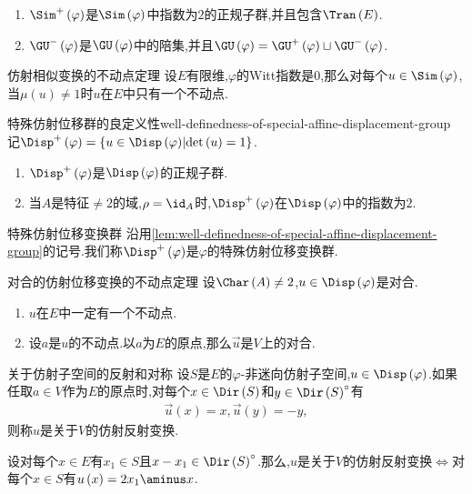 \begin{remark}{}{}
	\begin{enumerate}
		\item $\Sim^{+}\left(\varphi\right)$是$\Sim\left(\varphi\right)$中指数为$2$的正规子群,并且包含$\Tran\left(E\right)$.
		\item $\GU^{-}\left(\varphi\right)$是$\GU\left(\varphi\right)$中的陪集,并且$\GU\left(\varphi\right)=\GU^{+}\left(\varphi\right)\sqcup\GU^{-}\left(\varphi\right)$.
	\end{enumerate}
\end{remark}

\begin{proposition}{仿射相似变换的不动点定理}{}
	设$E$有限维,$\varphi$的Witt指数是$0$,那么对每个$u\in\Sim\left(\varphi\right)$,当$\mu\left(u\right)\neq 1$时$u$在$E$中只有一个不动点.
\end{proposition}

\begin{lemma}{特殊仿射位移群的良定义性}{well-definedness-of-special-affine-displacement-group}
	记$\Disp^{+}\left(\varphi\right)=\left\{u\in\Disp\left(\varphi\right)\middle|\det\left(u\right)=1\right\}$.
	\begin{enumerate}
		\item $\Disp^{+}\left(\varphi\right)$是$\Disp\left(\varphi\right)$的正规子群.
		\item 当$A$是特征$\neq 2$的域,$\rho=\id_{A}$时,$\Disp^{+}\left(\varphi\right)$在$\Disp\left(\varphi\right)$中的指数为$2$.
	\end{enumerate}
\end{lemma}

\begin{definition}{特殊仿射位移变换群}{}
	沿用\cref{lem:well-definedness-of-special-affine-displacement-group}的记号.我们称$\Disp^{+}\left(\varphi\right)$是$\varphi$的特殊仿射位移变换群.
\end{definition}

\begin{proposition}{对合的仿射位移变换的不动点定理}{}
	设$\Char\left(A\right)\neq 2$,$u\in\Disp\left(\varphi\right)$是对合.
	\begin{enumerate}
		\item $u$在$E$中一定有一个不动点.
		\item 设$a$是$u$的不动点.以$a$为$E$的原点,那么$\vec{u}$是$V$上的对合.
	\end{enumerate}
\end{proposition}

\begin{definition}{关于仿射子空间的反射和对称}{}
	设$S$是$E$的$\varphi$-非迷向仿射子空间,$u\in\Disp\left(\varphi\right)$.如果任取$a\in V$作为$E$的原点时,对每个$x\in\Dir\left(S\right)$和$y\in\Dir\left(S\right)^{\circ}$有
	\begin{align*}
		\vec{u}\left(x\right)=x,\vec{u}\left(y\right)=-y,
	\end{align*}
	则称$u$是关于$V$的仿射反射变换.
\end{definition}

\begin{remark}{}{}
	设对每个$x\in E$有$x_{1}\in S$且$x-x_{1}\in \Dir\left(S\right)^{\circ}$.那么,$u$是关于$V$的仿射反射变换$\iff$对每个$x\in S$有$u\left(x\right)=2x_{1}\aminus x$.
\end{remark}
